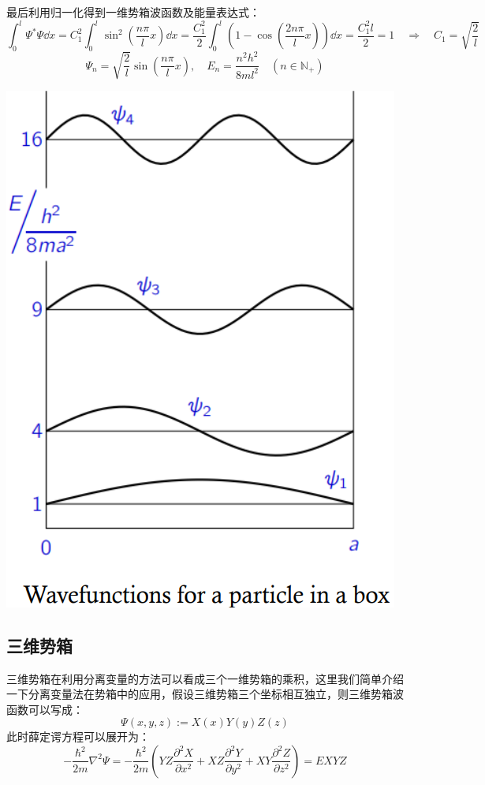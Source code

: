 最后利用归一化得到一维势箱波函数及能量表达式：
\[\int_0^l\varPsi^*\varPsi\dd{x}=C_1^2\int_0^l \sin^2\left (\frac{n \pi}{l}x \right )\dd{x}=\frac{C_1^2}{2}\int_0^l\left ( 1- \cos\left (\frac{2n \pi}{l}x \right ) \right )\dd{x}=\frac{C_1^2l}{2}=1 \quad \Rightarrow \quad C_1=\sqrt{\frac{2}{l}}\]
\[\varPsi_n=\sqrt{\frac{2}{l}}\sin\left (\frac{n \pi}{l}x \right ), \quad E_n=\frac{n^2 h^2}{8ml^2} \quad (n\in\mathbb{N}_+)\]

\begin{center}
    \includegraphics[scale=0.6]{fig/lzhx/微信图片_20211025150139.png}
\end{center}

\subsection{三维势箱}
三维势箱在利用分离变量的方法可以看成三个一维势箱的乘积，这里我们简单介绍一下分离变量法在势箱中的应用，假设三维势箱三个坐标相互独立，则三维势箱波函数可以写成：
\[\varPsi(x,y,z):=X(x)Y(y)Z(z)\]
此时薛定谔方程可以展开为：
\[-\frac{\hbar^2}{2m}\nabla^2\varPsi=-\frac{\hbar^2}{2m}\left (YZ\frac{\partial^2X}{\partial x^2}+XZ\frac{\partial^2Y}{\partial y^2}+XY\frac{\partial^2Z}{\partial z^2} \right )=EXYZ\]


